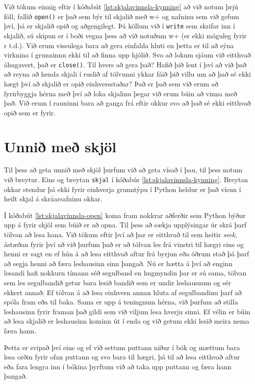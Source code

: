 Við tökum einnig eftir í kóðabút \ref{lst:skjalavinnsla-kynning} að við notum þrjú föll, fallið \texttt{open()} er það sem býr til skjalið með w+ og nafninu sem við gefum því, þá er skjalið opið og aðgengilegt.
Þá köllum við í \texttt{write} sem skrifar inn í skjalið, sú skipun er í boði vegna þess að við notuðum w+ (er ekki möguleg fyrir r t.d.).
Við erum vissulega bara að gera einfalda hluti en þetta er til að sýna virknina í grunninnn ekki til að finna upp hjólið.
Svo að lokum sjáum við eitthvað áhugavert, það er \texttt{close()}.
Til hvers að gera það?
Hafið þið lent í því að við það að reyna að henda skjali í ruslið af tölvunni ykkar fáið þið villu um að það sé ekki hægt því að skjalið er opið einhversstaðar?
Það er það sem við erum að fyrirbyggja hérna með því að loka skjalinu þegar við erum búin að vinna með það.
Við erum í rauninni bara að ganga frá eftir okkur svo að það sé ekki eitthvað opið sem er fyrir.

\section{Unnið með skjöl}\label{uk:skjalavinnsla-kynnt}
Til þess að geta unnið með skjöl þurfum við að geta vísað í þau, til þess notum við breytur.
Eins og breytan \texttt{skjal} í kóðabúr \ref{lst:skjalavinnsla-kynning}.
Breytan okkar stendur þá ekki fyrir einhverja grunntýpu í Python heldur er það vísun í heilt skjal á skráarsafninu okkar.

Í kóðabút \ref{lst:skjalavinnsla-open} koma fram nokkrar aðferðir sem Python býður upp á fyrir skjöl sem búið er að opna.
Til þess að sækja upplýsingar úr skrá þarf tölvan að lesa hana.
Við tökum eftir því að þar er eitthvað til sem heitir \textit{seek}, ástæðan fyrir því að við þurfum það er að tölvan les frá vinstri til hægri eins og henni er sagt en ef hún á að lesa eitthvað aftur frá byrjun eða öðrum stað þá þarf að segja henni að færa leshausinn sinn þangað.
Nú er hætta á því að enginn lesandi hafi nokkurn tímann séð segulband en hugmyndin þar er sú sama, tölvan sem les segulbandið getur bara lesið bandið sem er undir leshausnum og sér ekkert annað.
Ef tölvan á að lesa einhvern annan hluta af segulbandinu þarf að spóla fram eða til baka.
Sama er upp á teningnum hérna, við þurfum að stilla leshausinn fyrir framan það gildi sem við viljum lesa hverju sinni.
Ef vélin er búin að lesa skjalið er leshausinn kominn út í enda og við getum ekki lesið meira nema færa hann.

Þetta er svipað því eins og ef við settum puttann niður í bók og mættum bara lesa orðin fyrir ofan puttann og svo bara til hægri, þá til að lesa eitthvað aftur eða fara lengra inn í bókina þyrftum við að taka upp puttann og færa hann þangað.

